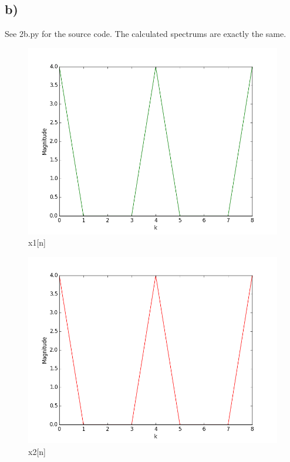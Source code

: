 \subsection*{b)}
See 2b.py for the source code. The calculated spectrums are exactly the same.

\begin{figure}[h]
  \centering
  \includegraphics[width=\linewidth]{2b_1}
  \caption{x1[n]}
  \label{fig:2b1}
\end{figure}
\begin{figure}[h]
  \centering
  \includegraphics[width=\linewidth]{2b_2}
  \caption{x2[n]}
  \label{fig:2b2}
\end{figure}

